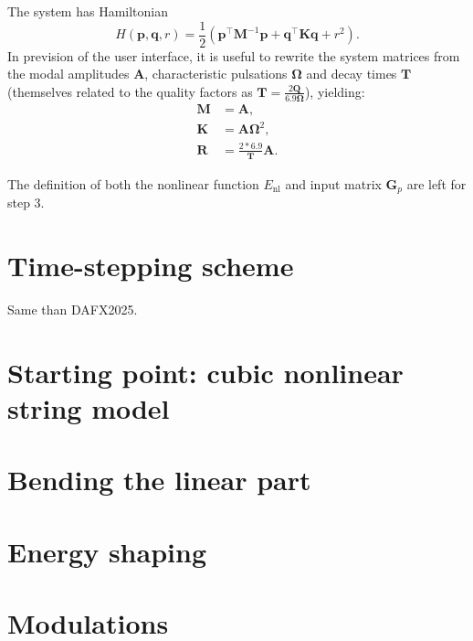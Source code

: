 \documentclass[9pt]{scrartcl}
\newcommand{\mat}[1]{\mathbf {#1}}
\begin{document}
  The system has Hamiltonian
  \begin{equation}
     H(\mat p, \mat q, r) = \frac{1}{2} \left(\mat p^\intercal \mat M^{-1} \mat p + \mat q^\intercal \mat K \mat q + r^2\right).
  \end{equation}
  In prevision of the user interface, it is useful to rewrite the system matrices from the modal amplitudes $\mat A$, characteristic pulsations $\boldsymbol{\Omega}$ and decay times $\mat T$ (themselves related to the quality factors as $\mat T = \frac{2 \mat Q}{6.9 \boldsymbol{\Omega}}$), yielding:
  \begin{align}
    \mat M& = \mat A, \\
    \mat K& = \mat A \boldsymbol{\Omega}^2,\\
    \mat R& = \frac{2 * 6.9}{\mat T} \mat A.
  \end{align}

  The definition of both the nonlinear function $E_{\mathrm{nl}}$ and input matrix $\mat G_p$ are left for step 3.

  \section{Time-stepping scheme}

  Same than DAFX2025.

  \section{Starting point: cubic nonlinear string model}

  \section{Bending the linear part}

  \section{Energy shaping}

  \section{Modulations}
\end{document}
